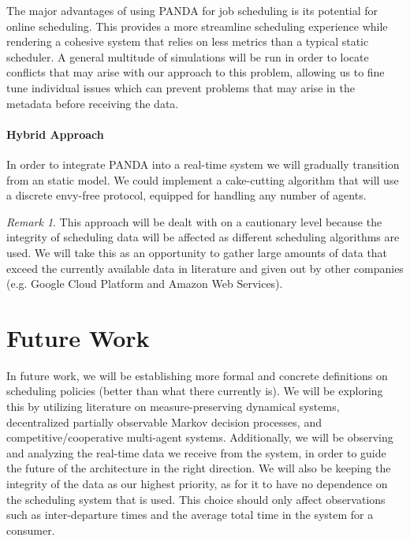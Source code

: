 \documentclass{article}
\theoremstyle{definition}
\theoremstyle{remark}
\newtheorem*{remark}{Remark}
\begin{document}
		The major advantages of using PANDA for job scheduling is its potential for online scheduling. This provides a more streamline scheduling experience while rendering a cohesive system that relies on less metrics than a typical static scheduler. A general multitude of simulations will be run in order to locate conflicts that may arise with our approach to this problem, allowing us to fine tune individual issues which can prevent problems that may arise in the metadata before receiving the data.

		\paragraph{Hybrid Approach} 
		
		In order to integrate PANDA into a real-time system we will gradually transition from an static model. We could implement a cake-cutting algorithm \cite{procaccia2015cake, aziz2016discrete} that will use a discrete envy-free protocol, equipped for handling any number of agents. 
		
		\begin{remark}
			This approach will be dealt with on a cautionary level because the integrity of scheduling data will be affected as different scheduling algorithms are used. We will take this as an opportunity to gather large amounts of data that exceed the currently available data in literature and given out by other companies (e.g. Google Cloud Platform and Amazon Web Services).
		\end{remark}
	
	\section{Future Work}
	
	In future work, we will be establishing more formal and concrete definitions on scheduling policies (better than what there currently is). We will be exploring this by utilizing literature on measure-preserving dynamical systems, decentralized partially observable Markov decision processes, and competitive/cooperative multi-agent systems. Additionally, we will be observing and analyzing the real-time data we receive from the system, in order to guide the future of the architecture in the right direction. We will also be keeping the integrity of the data as our highest priority, as for it to have no dependence on the scheduling system that is used. This choice should only affect observations such as inter-departure times and the average total time in the system for a consumer.

	\newpage

	\printbibliography
\end{document}
